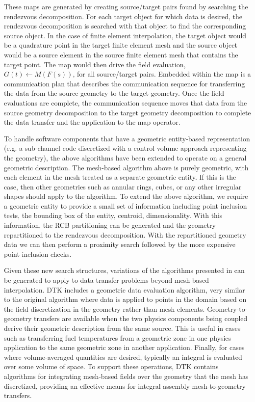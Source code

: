 \documentclass{mc2013}
\begin{document}
These maps are generated by creating source/target pairs found by
searching the rendezvous decomposition. For each target object for
which data is desired, the rendezvous decomposition is searched with
that object to find the corresponding source object. In the case of
finite element interpolation, the target object would be a quadrature
point in the target finite element mesh and the source object would be
a source element in the source finite element mesh that contains the
target point. The map would then drive the field evaluation,
$G(t)\leftarrow M(F(s))$, for all source/target pairs. Embedded within
the map is a communication plan that describes the communication
sequence for transferring the data from the source geometry to the
target geometry. Once the field evaluations are complete, the
communication sequence moves that data from the source geometry
decomposition to the target geometry decomposition to complete the
data transfer and the application to the map operator.

\label{subsec:general_geometry}

To handle software components that have a geometric entity-based
representation (e.g. a sub-channel code discretized with a control
volume approach representing the geometry), the above algorithms have
been extended to operate on a general geometric description. The
mesh-based algorithm above is purely geometric, with each element in
the mesh treated as a separate geometric entity. If this is the case,
then other geometries such as annular rings, cubes, or any other
irregular shapes should apply to the algorithm. To extend the above
algorithm, we require a geometric entity to provide a small set of
information including point inclusion tests, the bounding box of the
entity, centroid, dimensionality. With this information, the RCB
partitioning can be generated and the geometry repartitioned to the
rendezvous decomposition. With the repartitioned geometry data we can
then perform a proximity search followed by the more expensive point
inclusion checks.

Given these new search structures, variations of the algorithms
presented in \cite{Plimpton_2004} can be generated to apply to data
transfer problems beyond mesh-based interpolation. DTK includes a
geometric data evaluation algorithm, very similar to the original
algorithm where data is applied to points in the domain based on the
field discretization in the geometry rather than mesh
elements. Geometry-to-geometry transfers are available when the two
physics components being coupled derive their geometric description
from the same source. This is useful in cases such as transferring
fuel temperatures from a geometric zone in one physics application to
the same geometric zone in another application. Finally, for cases
where volume-averaged quantities are desired, typically an integral is
evaluated over some volume of space. To support these operations, DTK
contains algorithms for integrating mesh-based fields over the
geometry that the mesh has discretized, providing an effective means
for integral assembly mesh-to-geometry transfers.
\end{document}
